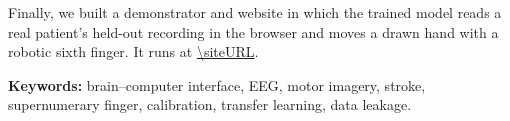 Finally, we built a demonstrator and website in which the trained model reads a real
patient's held-out recording in the browser and moves a drawn hand with a robotic sixth
finger. It runs at \url{\siteURL}.

\noindent\textbf{Keywords:} brain--computer interface, EEG, motor imagery, stroke,
supernumerary finger, calibration, transfer learning, data leakage.
